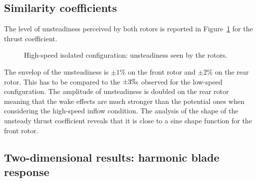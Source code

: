 
\subsection{Similarity coefficients}
\label{sub:dream_hs_hb_sim_coeff}


The level of unsteadiness perceived by both rotors is reported
in Figure~\ref{fig:dream_hs_hb_unst_coeff} for the thrust coefficient.
\begin{figure}[htp]
  \centering
  \caption{High-speed isolated configuration: unsteadiness seen by the rotors.}
  \label{fig:dream_hs_hb_unst_coeff}
\end{figure}
The envelop of the unsteadiness is $\pm 1\%$ on the front rotor
and $\pm 2\%$ on the rear rotor. This has to be compared to 
the $\pm 3 \permil$ observed for the low-speed configuration.
The amplitude of unsteadiness is doubled on the rear rotor
meaning that the wake effects are much stronger than the
potential ones when considering the high-speed inflow condition.
The analysis of the shape of the unsteady thrust coefficient
reveals that it is close to a sine shape function for the front
rotor.

\subsection{Two-dimensional results: harmonic blade response}
\label{sub:dream_hs_hb_blade_response}

